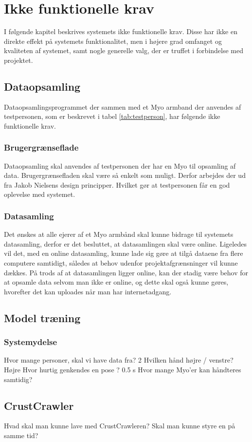 \thispagestyle{fancy}
\chapter{Ikke funktionelle krav}
I følgende kapitel beskrives systemets ikke funktionelle krav. Disse har ikke en direkte effekt på systemets funktionalitet, men i højere grad omfanget og kvaliteten af systemet, samt nogle generelle valg, der er truffet i forbindelse med projektet.

\section{Dataopsamling}
Dataopsamlingsprogrammet der sammen med et Myo armband der anvendes af testpersonen, som er beskrevet i tabel \ref{tab:testperson}, har følgende ikke funktionelle krav.

\subsection{Brugergrænseflade}
Dataopsamling skal anvendes af testpersonen der har en Myo til opsamling af data. Brugergrænsefladen skal være så enkelt som muligt.  Derfor arbejdes der ud fra Jakob Nielsens design principper. Hvilket gør at testpersonen får en god oplevelse med systemet.

\subsection{Datasamling}
Det ønskes at alle ejerer af et Myo armbånd skal kunne bidrage til systemets datasamling, derfor er det besluttet, at datasamlingen skal være online. Ligeledes vil det, med en online datasamling, kunne lade sig gøre at tilgå dataene fra flere computere samtidigt, således at behov udenfor projektafgrænsninger vil kunne dækkes. På trods af at datasamlingen ligger online, kan der stadig være behov for at opsamle data selvom man ikke er online, og dette skal også kunne gøres, hvorefter det kan uploades når man har internetadgang.

\section{Model træning}

\subsection{Systemydelse}
Hvor mange personer, skal vi have data fra? 2
Hvilken hånd højre / venstre? Højre
Hvor hurtig genkendes en pose ? 0.5 s
Hvor mange Myo'er kan håndteres samtidig?



\section{CrustCrawler}

Hvad skal man kunne lave med CrustCrawleren?
Skal man kunne styre en på samme tid?